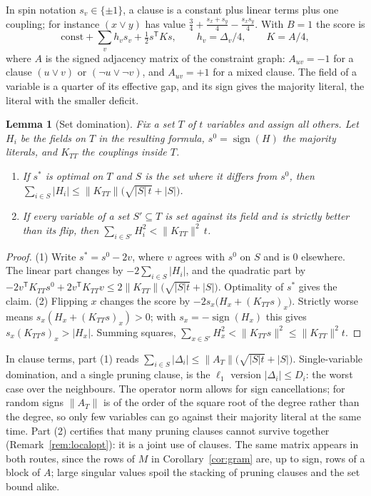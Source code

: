 \documentclass[11pt,a4paper]{article}
\newtheorem{lemma}[theorem]{Lemma}
\theoremstyle{remark}
\begin{document}
In spin notation $s_v\in\{\pm1\}$, a clause is a constant plus linear terms
plus one coupling; for instance $(x\lor y)$ has value
$\frac34+\frac{s_x+s_y}4-\frac{s_xs_y}4$. With $B=1$ the score is
\[
 \mathrm{const}+\sum_vh_vs_v+\tfrac12s^{\mathsf T}Ks,\qquad
 h_v=\Delta_v/4,\qquad K=A/4,
\]
where $A$ is the signed adjacency matrix of the constraint graph: $A_{uv}=-1$
for a clause $(u\lor v)$ or $(\neg u\lor\neg v)$, and $A_{uv}=+1$ for a mixed
clause. The field of a variable is a quarter of its effective gap, and its sign
gives the majority literal, the literal with the smaller deficit.

\begin{lemma}[Set domination]\label{lem:setdom}
Fix a set $T$ of $t$ variables and assign all others. Let $H_i$ be the fields
on $T$ in the resulting formula, $s^0=\operatorname{sign}(H)$ the majority
literals, and $K_{TT}$ the couplings inside $T$.
\begin{enumerate}
 \item If $s^*$ is optimal on $T$ and $S$ is the set where it differs from
 $s^0$, then $\sum_{i\in S}|H_i|\le\|K_{TT}\|\bigl(\sqrt{|S|\,t}+|S|\bigr)$.
 \item If every variable of a set $S'\subseteq T$ is set against its field and
 is strictly better than its flip, then $\sum_{i\in S'}H_i^2<\|K_{TT}\|^2\,t$.
\end{enumerate}
\end{lemma}

\begin{proof}
(1) Write $s^*=s^0-2v$, where $v$ agrees with $s^0$ on $S$ and is $0$
elsewhere. The linear part changes by $-2\sum_{i\in S}|H_i|$, and the quadratic
part by $-2v^{\mathsf T}K_{TT}s^0+2v^{\mathsf T}K_{TT}v
\le2\|K_{TT}\|\bigl(\sqrt{|S|t}+|S|\bigr)$. Optimality of $s^*$ gives the
claim.
(2) Flipping $x$ changes the score by $-2s_x\bigl(H_x+(K_{TT}s)_x\bigr)$.
Strictly worse means $s_x(H_x+(K_{TT}s)_x)>0$; with $s_x=-\operatorname{sign}(H_x)$
this gives $s_x(K_{TT}s)_x>|H_x|$. Summing squares,
$\sum_{x\in S'}H_x^2<\|K_{TT}s\|^2\le\|K_{TT}\|^2t$.
\end{proof}

In clause terms, part (1) reads
$\sum_{i\in S}|\Delta_i|\le\|A_T\|\bigl(\sqrt{|S|t}+|S|\bigr)$. Single-variable
domination, and a single pruning clause, is the $\ell_1$ version
$|\Delta_i|\le D_i$: the worst case over the neighbours. The operator norm
allows for sign cancellations; for random signs $\|A_T\|$ is of the order of
the square root of the degree rather than the degree, so only few variables can
go against their majority literal at the same time. Part (2) certifies that
many pruning clauses cannot survive together (Remark~\ref{rem:localopt}): it is
a joint use of clauses. The same matrix appears in both routes, since the rows
of $M$ in Corollary~\ref{cor:gram} are, up to sign, rows of a block of $A$;
large singular values spoil the stacking of pruning clauses and the set bound
alike.
\end{document}
